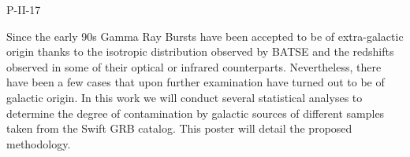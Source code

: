 P-II-17


\bigskip



\bigskip

\noindent Since the early 90s Gamma Ray Bursts have been accepted to be of extra-galactic origin thanks to the isotropic distribution observed by BATSE and the redshifts observed in some of their optical or infrared counterparts. Nevertheless, there have been a few cases that upon further examination have turned out to be of galactic origin. In this work we will conduct several statistical analyses to determine the degree of contamination by galactic sources of different samples taken from the Swift GRB catalog. This poster will detail the proposed methodology.

